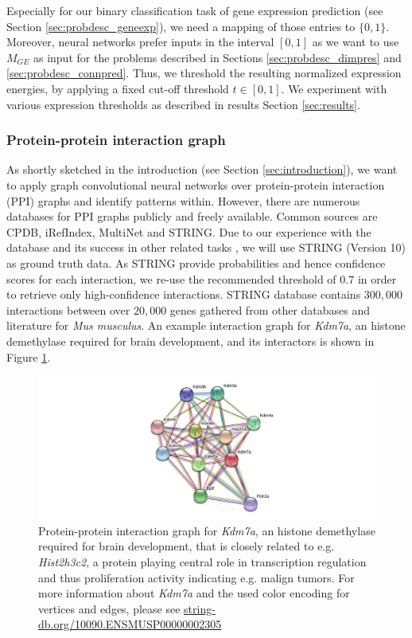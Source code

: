 \documentclass[]{article}
\renewcommand{\cite}{\citep}
\begin{document}
Especially for our binary classification task of gene expression prediction (see Section \ref{sec:probdesc_geneexp}), we need a mapping of those entries to $\{0,1\}$. Moreover, neural networks prefer inputs in the interval $[0,1]$ as we want to use $M_{GE}$ as input for the problems described in Sections \ref{sec:probdesc_dimpres} and \ref{sec:probdesc_connpred}. Thus, we threshold the resulting normalized expression energies, by applying a fixed cut-off threshold $t\in[0,1]$. We experiment with various expression thresholds as described in results Section \ref{sec:results}.

\subsubsection{Protein-protein interaction graph}
As shortly sketched in the introduction (see Section \ref{sec:introduction}), we want to apply graph convolutional neural networks over protein-protein interaction (PPI) graphs and identify patterns within. However, there are numerous databases for PPI graphs publicly and freely available.
Common sources are CPDB\cite{lo2009cpdb}, iRefIndex\cite{razick2008irefindex}, MultiNet\cite{sengupta2023multinet} and STRING\cite{STRINGv10}. Due to our experience with the database and its success in other related tasks \cite{schulte2021integration, wang2021mogonet, hinnerichs2021dti}, we will use STRING (Version 10) as ground truth data. As STRING provide probabilities and hence confidence scores for each interaction, we re-use the recommended threshold of $0.7$ in order to retrieve only high-confidence interactions. STRING database contains $300,000$ interactions between over $20,000$ genes gathered from other databases and literature for \textit{Mus musculus}. An example interaction graph for \textit{Kdm7a}, an histone demethylase required for brain development, and its interactors is shown in Figure \ref{fig:PPI_graph}.

\begin{figure}
	\centering
	\includegraphics[width=1.\linewidth]{figures/string_hires_image.png}
	\caption[Protein-protein interaction graph for \textit{Kdm7a}]{Protein-protein interaction graph for \textit{Kdm7a}, an histone demethylase required for brain development, that is closely related to e.g. \textit{Hist2h3c2}, a protein playing central role in transcription regulation and thus proliferation activity indicating e.g. malign tumors. For more information about \textit{Kdm7a} and the used color encoding for vertices and edges, please see \href{https://string-db.org/network/10090.ENSMUSP00000002305}{string-db.org/10090.ENSMUSP00000002305}}
	\label{fig:PPI_graph}
\end{figure}
\end{document}
